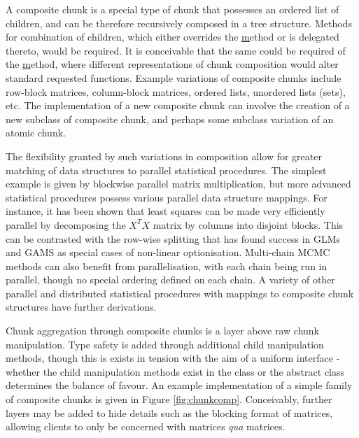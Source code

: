 \documentclass[10pt, a4paper]{article}
\begin{document}
A composite chunk is a special type of chunk that possesses an ordered list of children, and can be therefore recursively composed in a tree structure.
Methods for combination of children, which either overrides the \href{data()} method or is delegated thereto, would be required.
It is conceivable that the same could be required of the \href{do()} method, where different representations of chunk composition would alter standard requested functions.
Example variations of composite chunks include row-block matrices, column-block matrices, ordered lists, unordered lists (sets), etc.
The implementation of a new composite chunk can involve the creation of a new subclass of composite chunk, and perhaps some subclass variation of an atomic chunk.

The flexibility granted by such variations in composition allow for greater matching of data structures to parallel statistical procedures.
The simplest example is given by blockwise parallel matrix multiplication, but more advanced statistical procedures possess various parallel data structure mappings.
For instance, it has been shown that least squares can be made very efficiently parallel by decomposing the $X^TX$ matrix by columns into disjoint blocks\cite{renaut1998parallel}.
This can be contrasted with the row-wise splitting that has found success in GLMs and GAMS as special cases of non-linear optionisation\cite{suri2002parallel}.
Multi-chain MCMC methods can also benefit from parallelisation, with each chain being run in parallel, though no special ordering defined on each chain\cite{strid2010parmcmc}.
A variety of other parallel and distributed statistical procedures with mappings to composite chunk structures have further derivations\cite{guo2012parallel}.

Chunk aggregation through composite chunks is a layer above raw chunk manipulation.
Type safety is added through additional child manipulation methods, though this is exists in tension with the aim of a uniform interface - whether the child manipulation methods exist in the  class or the abstract  class determines the balance of favour.
An example implementation of a simple family of composite chunks is given in Figure \ref{fig:chunkcomp}.
Conceivably, further layers may be added to hide details such as the blocking format of matrices, allowing clients to only be concerned with matrices \textit{qua} matrices.


\end{document}
